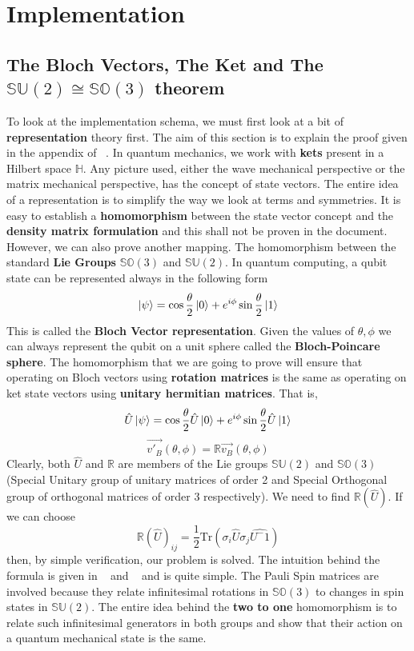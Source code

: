 \documentclass[12pt]{article}
\begin{document}
\section{Implementation}
\subsection{The Bloch Vectors, The Ket and The $\mathbb{SU}(2)\cong\mathbb{SO}(3)$ theorem}
To look at the implementation schema, we must first look at a bit of \textbf{representation} theory first. The aim of this section is to explain the proof given in the appendix of ~\cite{ohio}. In quantum mechanics, we work with \textbf{kets} present in a Hilbert space $\mathbb{H}$. Any picture used, either the wave mechanical perspective or the matrix mechanical perspective, has the concept of state vectors. The entire idea of a representation is to simplify the way we look at terms and symmetries. It is easy to establish a \textbf{homomorphism} between the state vector concept and the \textbf{density matrix formulation} and this shall not be proven in the document. However, we can also prove another mapping. The homomorphism between the standard \textbf{Lie Groups} $\mathbb{SO}(3)$ and $\mathbb{SU}(2)$. In quantum computing, a qubit state can be represented always in the following form $$\ket{\psi} = \cos\frac{\theta}{2}\ket{0}+e^{i\phi}\sin\frac{\theta}{2}\ket{1}$$ This is called the \textbf{Bloch Vector representation}. Given the values of $\theta, \phi$ we can always represent the qubit on a unit sphere called the \textbf{Bloch-Poincare sphere}. The homomorphism that we are going to prove will ensure that operating on Bloch vectors using \textbf{rotation matrices} is the same as operating on ket state vectors using \textbf{unitary hermitian matrices}. That is, 
$$\hat{U}\ket{\psi} = \cos\frac{\theta}{2}\hat{U}\ket{0} + e^{i\phi}\sin\frac{\theta}{2}\hat{U}\ket{1}$$
$$\vec{v'_B}(\theta,\phi) = \mathbb{R}\vec{v_B}(\theta, \phi)$$
Clearly, both $\hat{U}$ and $\mathbb{R}$ are members of the Lie groups $\mathbb{SU}(2)$ and $\mathbb{SO}(3)$(Special Unitary group of unitary matrices of order 2 and Special Orthogonal group of orthogonal matrices of order 3 respectively). We need to find $\mathbb{R}(\hat{U})$. If we can choose $$\mathbb{R}(\hat{U})_{ij} = \frac{1}{2}\mathrm{Tr}(\sigma_i\hat{U}\sigma_j\hat{U^-1})$$ then, by simple verification, our problem is solved. The intuition behind the formula is given in ~\cite{corn} and ~\cite{ohio} and is quite simple. The Pauli Spin matrices are involved because they relate infinitesimal rotations in $\mathbb{SO}(3)$ to changes in spin states in $\mathbb{SU}(2)$. The entire idea behind the \textbf{two to one} homomorphism is to relate such infinitesimal generators in both groups and show that their action on a quantum mechanical state is the same. 
\end{document}

